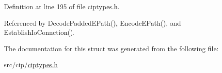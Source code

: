 \-Definition at line 195 of file ciptypes.\-h.



\-Referenced by \-Decode\-Padded\-E\-Path(), \-Encode\-E\-Path(), and \-Establish\-Io\-Connction().



\-The documentation for this struct was generated from the following file\-:\begin{DoxyCompactItemize}
\item 
src/cip/\hyperlink{ciptypes_8h}{ciptypes.\-h}\end{DoxyCompactItemize}
